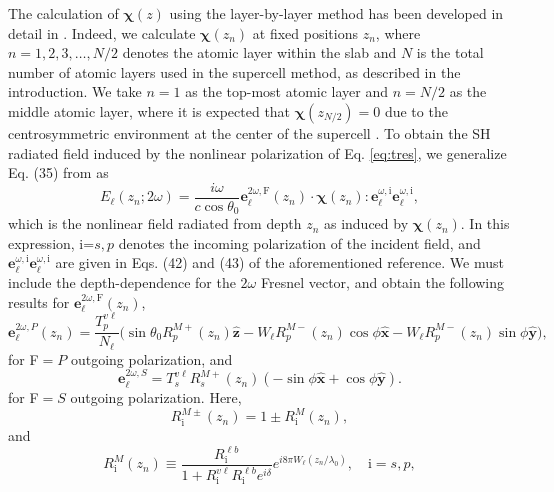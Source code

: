 \documentclass[utf8]{frontiersSCNS}
\begin{document}
The calculation of $\boldsymbol{\chi}(z)$ using the layer-by-layer method has
been developed in detail in \cite{andersonPRB15}. Indeed, we calculate
$\boldsymbol{\chi}(z_{n})$ at fixed positions $z_{n}$, where $n =
1,2,3,\ldots,N/2$ denotes the atomic layer within the slab and $N$ is the total
number of atomic layers used in the supercell method, as described in the
introduction. We take $n = 1$ as the top-most atomic layer and $n = N/2$ as the
middle atomic layer, where it is expected that $\boldsymbol{\chi}(z_{N/2}) = 0$
due to the centrosymmetric environment at the center of the supercell
\citep{andersonPRB15}. To obtain the SH radiated field induced by the nonlinear
polarization of Eq. \eqref{eq:tres}, we generalize Eq. (35) from
\cite{andersonPRB16b} as
\begin{equation}\label{eq:mr10n}
E_{\ell}(z_{n};2\omega) = 
\frac{i \omega}{c\cos\theta_{0}}
\mathbf{e}^{2\omega,\mathrm{F}}_{\ell}(z_{n})\cdot 
\boldsymbol{\chi}(z_{n}): 
\mathbf{e}^{\omega,\mathrm{i}}_{\ell}
\mathbf{e}^{\omega,\mathrm{i}}_{\ell},
\end{equation}
which is the nonlinear field radiated from depth $z_{n}$ as induced by
$\boldsymbol{\chi}(z_{n})$. In this expression, i=$s,p$ denotes the incoming
polarization of the incident field, and
$\mathbf{e}^{\omega,\mathrm{i}}_{\ell}\mathbf{e}^{\omega,\mathrm{i}}_{\ell}$ are
given in Eqs. (42) and (43) of the aforementioned reference. We must include the
depth-dependence for the $2\omega$ Fresnel vector, and obtain the following
results for $\mathbf{e}^{2\omega,\mathrm{F}}_{\ell}(z_{n})$,
\begin{equation}\label{eq:e2wpmrn}
\mathbf{e}^{2\omega,P}_{\ell}(z_{n}) =
\frac{T^{v\ell}_{p}}{N_{\ell}}
\big(
  \sin\theta_{0}R^{M+}_{p}(z_{n})\mathbf{\hat{z}} 
- W_{\ell}R^{M-}_{p}(z_{n})\cos\phi\mathbf{\hat{x}}
- W_{\ell}R^{M-}_{p}(z_{n})\sin\phi\mathbf{\hat{y}}
\big),
\end{equation}
for F$=P$ outgoing polarization, and
\begin{equation}\label{eq:e2wsmrn}
\mathbf{e}^{2\omega,S}_{\ell} =
T_{s}^{v\ell}R^{M+}_{s}(z_{n})
\left(
- \sin\phi\mathbf{\hat{x}}
+ \cos\phi\mathbf{\hat{y}}
\right). 
\end{equation}
for F$=S$ outgoing polarization. Here,
\begin{equation}\label{eq:n1}
R^{M\pm}_{\mathrm{i}}(z_{n}) = 1\pm R^{M}_{\mathrm{i}}(z_{n}),
\end{equation}
and
\begin{equation}\label{m61n} 
R^{M}_{\mathrm{i}}(z_{n}) \equiv
\frac{R^{\ell b}_{\mathrm{i}}}
     {1+R^{v\ell}_{\mathrm{i}} R^{\ell b}_{\mathrm{i}}e^{i\delta}} 
e^{i8\pi W_{\ell}(z_{n}/\lambda_{0})}, \quad \mathrm{i}=s,p,
\end{equation} 
\end{document}
